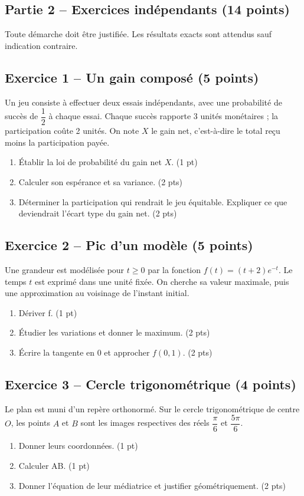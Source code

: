 \clearpage\subsection*{Partie 2 -- Exercices indépendants (14 points)}
Toute démarche doit être justifiée. Les résultats exacts sont attendus sauf indication contraire.
\subsection*{Exercice 1 -- Un gain composé (5 points)}
Un jeu consiste à effectuer deux essais indépendants, avec une probabilité de succès de $\dfrac12$ à chaque essai. Chaque succès rapporte 3 unités monétaires ; la participation coûte 2 unités. On note $X$ le gain net, c’est-à-dire le total reçu moins la participation payée.
\begin{enumerate}
\item Établir la loi de probabilité du gain net $X$. \hfill(1 pt)
\item Calculer son espérance et sa variance. \hfill(2 pts)
\item Déterminer la participation qui rendrait le jeu équitable. Expliquer ce que deviendrait l’écart type du gain net. \hfill(2 pts)
\end{enumerate}
\subsection*{Exercice 2 -- Pic d’un modèle (5 points)}
Une grandeur est modélisée pour $t\geq0$ par la fonction $f(t)=(t+2)e^{-t}$. Le temps $t$ est exprimé dans une unité fixée. On cherche sa valeur maximale, puis une approximation au voisinage de l’instant initial.
\begin{enumerate}
\item Dériver f. \hfill(1 pt)
\item Étudier les variations et donner le maximum. \hfill(2 pts)
\item Écrire la tangente en 0 et approcher $f(0{,}1)$. \hfill(2 pts)
\end{enumerate}
\subsection*{Exercice 3 -- Cercle trigonométrique (4 points)}
Le plan est muni d’un repère orthonormé. Sur le cercle trigonométrique de centre $O$, les points $A$ et $B$ sont les images respectives des réels $\dfrac\pi6$ et $\dfrac{5\pi}6$.
\begin{enumerate}
\item Donner leurs coordonnées. \hfill(1 pt)
\item Calculer AB. \hfill(1 pt)
\item Donner l’équation de leur médiatrice et justifier géométriquement. \hfill(2 pts)
\end{enumerate}
